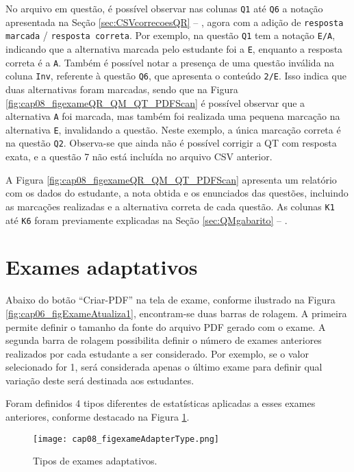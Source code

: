 No arquivo em questão, é possível observar nas colunas \verb|Q1| até \verb|Q6| a notação apresentada na Seção \ref{sec:CSVcorrecoesQR} -- , agora com a adição de \verb|resposta marcada| / \verb|resposta correta|. Por exemplo, na questão \verb|Q1| tem a notação \verb|E/A|, indicando que a alternativa marcada pelo estudante foi a \verb|E|, enquanto a resposta correta é a \verb|A|. Também é possível notar a presença de uma questão inválida na coluna \verb|Inv|, referente à questão \verb|Q6|, que apresenta o conteúdo \verb|2/E|. Isso indica que duas alternativas foram marcadas, sendo que na Figura \ref{fig:cap08_figexameQR_QM_QT_PDFScan} é possível observar que a alternativa \verb|A| foi marcada, mas também foi realizada uma pequena marcação na alternativa \verb|E|, invalidando a questão. Neste exemplo, a única marcação correta é na questão \verb|Q2|. Observa-se que ainda não é possível corrigir a QT com resposta exata, e a questão 7 não está incluída no arquivo CSV anterior.

A Figura \ref{fig:cap08_figexameQR_QM_QT_PDFScan} apresenta um relatório com os dados do estudante, a nota obtida e os enunciados das questões, incluindo as marcações realizadas e a alternativa correta de cada questão. As colunas \verb|K1| até \verb|K6| foram previamente explicadas na Seção \ref{sec:QMgabarito} -- .

\section{Exames adaptativos}\label{sec:testeAdaptativo}

Abaixo do botão ``Criar-PDF'' na tela de exame, conforme ilustrado na Figura \ref{fig:cap06_figExameAtualiza1}, encontram-se duas barras de rolagem. A primeira permite definir o tamanho da fonte do arquivo PDF gerado com o exame. A segunda barra de rolagem possibilita definir o número de exames anteriores realizados por cada estudante a ser considerado. Por exemplo, se o valor selecionado for 1, será considerada apenas o último exame para definir qual variação deste será destinada aos estudantes. 

Foram definidos 4 tipos diferentes de estatísticas aplicadas a esses exames anteriores, conforme destacado na Figura \ref{fig:cap08_figexameAdapterType}.

\begin{figure}[!ht]
  \centering
  \texttt{[image: cap08\_figexameAdapterType.png]}
   \caption{Tipos de exames adaptativos.}
\label{fig:cap08_figexameAdapterType}
\end{figure}

